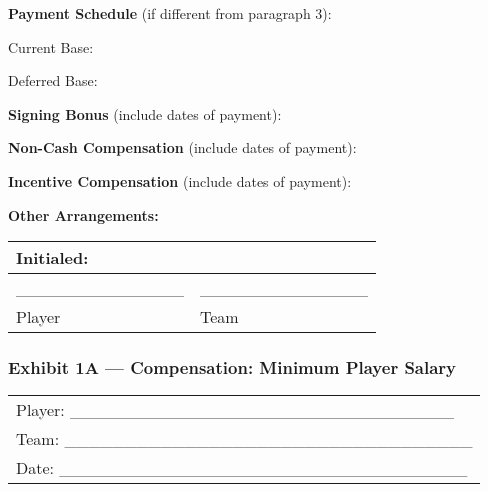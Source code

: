 \documentclass[
]{book}
\begin{document}
\textbf{Payment Schedule} (if different from paragraph 3):

Current Base:

Deferred Base:

\textbf{Signing Bonus} (include dates of payment):

\textbf{Non-Cash Compensation} (include dates of payment):

\textbf{Incentive Compensation} (include dates of payment):

\textbf{Other Arrangements:}

\begin{longtable}[]{@{}ll@{}}
\toprule()
Initialed: & \\
\midrule()
\endhead
\_\_\_\_\_\_\_\_\_\_\_\_\_\_ & \_\_\_\_\_\_\_\_\_\_\_\_\_\_ \\
Player & Team \\
\bottomrule()
\end{longtable}

\newpage

\hypertarget{exhibit-1a-compensation-minimum-player-salary}{%
\subsubsection{Exhibit 1A --- Compensation: Minimum Player Salary}\label{exhibit-1a-compensation-minimum-player-salary}}

\begin{longtable}[]{@{}l@{}}
\toprule()
\endhead
Player: \_\_\_\_\_\_\_\_\_\_\_\_\_\_\_\_\_\_\_\_\_\_\_\_\_\_\_\_\_\_\_\_ \\
Team: \_\_\_\_\_\_\_\_\_\_\_\_\_\_\_\_\_\_\_\_\_\_\_\_\_\_\_\_\_\_\_\_\_\_ \\
Date: \_\_\_\_\_\_\_\_\_\_\_\_\_\_\_\_\_\_\_\_\_\_\_\_\_\_\_\_\_\_\_\_\_\_ \\
\bottomrule()
\end{longtable}
\end{document}
